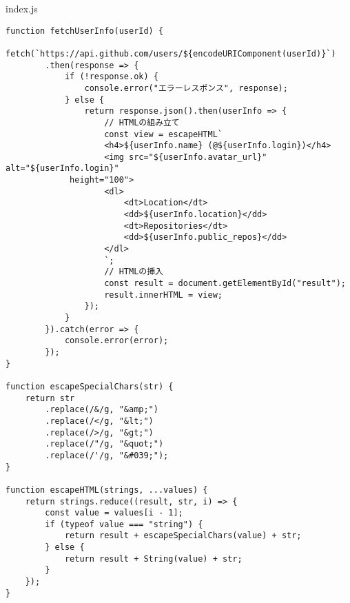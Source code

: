 \begin{listtitle}
index.js
\end{listtitle}
\begin{lstlisting}
function fetchUserInfo(userId) {
    fetch(`https://api.github.com/users/${encodeURIComponent(userId)}`)
        .then(response => {
            if (!response.ok) {
                console.error("エラーレスポンス", response);
            } else {
                return response.json().then(userInfo => {
                    // HTMLの組み立て
                    const view = escapeHTML`
                    <h4>${userInfo.name} (@${userInfo.login})</h4>
                    <img src="${userInfo.avatar_url}" alt="${userInfo.login}"
		     height="100">
                    <dl>
                        <dt>Location</dt>
                        <dd>${userInfo.location}</dd>
                        <dt>Repositories</dt>
                        <dd>${userInfo.public_repos}</dd>
                    </dl>
                    `;
                    // HTMLの挿入
                    const result = document.getElementById("result");
                    result.innerHTML = view;
                });
            }
        }).catch(error => {
            console.error(error);
        });
}

function escapeSpecialChars(str) {
    return str
        .replace(/&/g, "&amp;")
        .replace(/</g, "&lt;")
        .replace(/>/g, "&gt;")
        .replace(/"/g, "&quot;")
        .replace(/'/g, "&#039;");
}

function escapeHTML(strings, ...values) {
    return strings.reduce((result, str, i) => {
        const value = values[i - 1];
        if (typeof value === "string") {
            return result + escapeSpecialChars(value) + str;
        } else {
            return result + String(value) + str;
        }
    });
}
\end{lstlisting}
\listend
